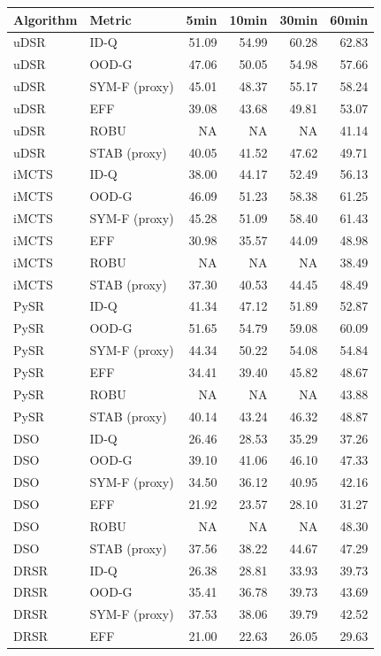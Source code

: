 \begin{tabular}{llrrrr}
\toprule
Algorithm & Metric & 5min & 10min & 30min & 60min \\
\midrule
uDSR & ID-Q & 51.09 & 54.99 & 60.28 & 62.83 \\
uDSR & OOD-G & 47.06 & 50.05 & 54.98 & 57.66 \\
uDSR & SYM-F (proxy) & 45.01 & 48.37 & 55.17 & 58.24 \\
uDSR & EFF & 39.08 & 43.68 & 49.81 & 53.07 \\
uDSR & ROBU & NA & NA & NA & 41.14 \\
uDSR & STAB (proxy) & 40.05 & 41.52 & 47.62 & 49.71 \\
iMCTS & ID-Q & 38.00 & 44.17 & 52.49 & 56.13 \\
iMCTS & OOD-G & 46.09 & 51.23 & 58.38 & 61.25 \\
iMCTS & SYM-F (proxy) & 45.28 & 51.09 & 58.40 & 61.43 \\
iMCTS & EFF & 30.98 & 35.57 & 44.09 & 48.98 \\
iMCTS & ROBU & NA & NA & NA & 38.49 \\
iMCTS & STAB (proxy) & 37.30 & 40.53 & 44.45 & 48.49 \\
PySR & ID-Q & 41.34 & 47.12 & 51.89 & 52.87 \\
PySR & OOD-G & 51.65 & 54.79 & 59.08 & 60.09 \\
PySR & SYM-F (proxy) & 44.34 & 50.22 & 54.08 & 54.84 \\
PySR & EFF & 34.41 & 39.40 & 45.82 & 48.67 \\
PySR & ROBU & NA & NA & NA & 43.88 \\
PySR & STAB (proxy) & 40.14 & 43.24 & 46.32 & 48.87 \\
DSO & ID-Q & 26.46 & 28.53 & 35.29 & 37.26 \\
DSO & OOD-G & 39.10 & 41.06 & 46.10 & 47.33 \\
DSO & SYM-F (proxy) & 34.50 & 36.12 & 40.95 & 42.16 \\
DSO & EFF & 21.92 & 23.57 & 28.10 & 31.27 \\
DSO & ROBU & NA & NA & NA & 48.30 \\
DSO & STAB (proxy) & 37.56 & 38.22 & 44.67 & 47.29 \\
DRSR & ID-Q & 26.38 & 28.81 & 33.93 & 39.73 \\
DRSR & OOD-G & 35.41 & 36.78 & 39.73 & 43.69 \\
DRSR & SYM-F (proxy) & 37.53 & 38.06 & 39.79 & 42.52 \\
DRSR & EFF & 21.00 & 22.63 & 26.05 & 29.63 \\

\end{tabular}
